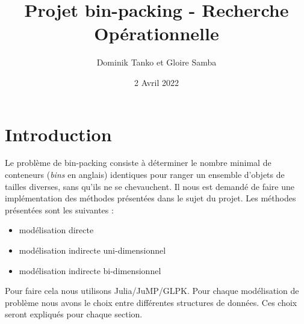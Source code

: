 \documentclass{article}
\title{Projet bin-packing - Recherche Opérationnelle}
\author{Dominik Tanko et Gloire Samba}
\date{2 Avril 2022}
\begin{document}
\maketitle

\renewcommand*\contentsname{Sommaire}
\tableofcontents


\newpage

\section{Introduction}
    Le problème de bin-packing consiste à déterminer le nombre minimal de conteneurs (\textit{bins} en anglais) identiques pour ranger un ensemble d’objets de tailles diverses, sans qu’ils ne se chevauchent.
    Il nous est demandé de faire une implémentation des méthodes présentées dans le sujet du projet. Les méthodes présentées sont les suivantes : 
    \begin{itemize}
        \item modélisation directe
        \item modélisation indirecte uni-dimensionnel
        \item modélisation indirecte bi-dimensionnel
    \end{itemize}
    Pour faire cela nous utilisons Julia/JuMP/GLPK. Pour chaque modélisation de problème nous avons le choix entre différentes structures de données. Ces choix seront expliqués pour chaque section.
\end{document}
